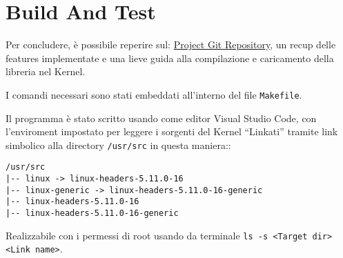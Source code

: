 \section{Build And Test} \label{buildAndTest}

Per concludere, è possibile reperire sul: \href{https://github.com/Alfystar/SOA-prj}{Project Git Repository}, un recup
delle features implementate e una lieve guida alla compilazione e caricamento della libreria nel Kernel.

I comandi necessari sono stati embeddati all'interno del file \verb|Makefile|.

Il programma è stato scritto usando come editor Visual Studio Code, con l'enviroment impostato per leggere i sorgenti
del Kernel ``Linkati'' tramite link simbolico alla directory \verb|/usr/src| in questa maniera::

\begin{verbatim}
/usr/src
|-- linux -> linux-headers-5.11.0-16
|-- linux-generic -> linux-headers-5.11.0-16-generic
|-- linux-headers-5.11.0-16
|-- linux-headers-5.11.0-16-generic
\end{verbatim}

Realizzabile con i permessi di root usando da terminale \verb|ls -s <Target dir> <Link name>|.
